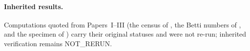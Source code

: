 \begin{table}[h]\centering\footnotesize\caption{\textbf{Betti numbers of the two $G=5$ towers} $K(D(x_k))$, $x_k=(S_02^k)^2/5$, over $\mathbb F_2$, trailing zeros omitted. Finite-exact for $0\le k\le14$.}\label{tab:towers}\end{table}
\paragraph{Inherited results.} Computations quoted from Papers~I--III (the census of , the Betti numbers of , and the specimen of ) carry their original statuses and were not re-run; inherited verification remains \textsc{NOT\_RERUN}.
